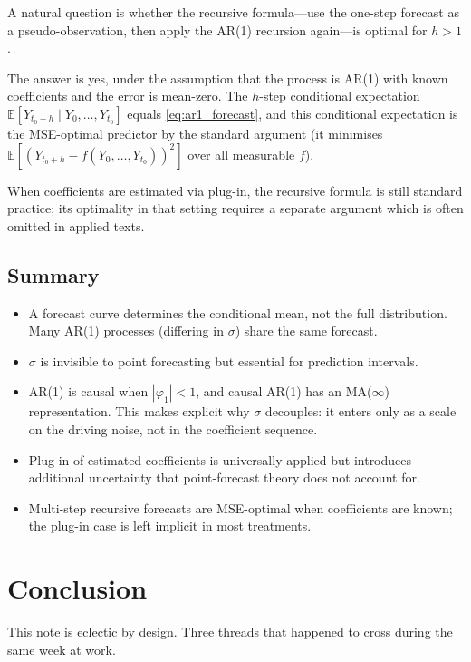 \documentclass[a4paper,oneside,12pt]{extarticle}
\theoremstyle{plain}
\theoremstyle{definition}
\theoremstyle{remark}
\newcommand*{\E}{\mathbb{E}}
\begin{document}
A natural question is whether the recursive formula---use the one-step
forecast as a pseudo-observation, then apply the AR(1) recursion again---is
optimal for $h > 1$.

The answer is yes, under the assumption that the process is AR(1) with
known coefficients and the error is mean-zero. The $h$-step conditional
expectation $\E[Y_{t_0+h} \mid Y_0, \ldots, Y_{t_0}]$ equals
\eqref{eq:ar1_forecast}, and this conditional expectation is the MSE-optimal
predictor by the standard argument (it minimises
$\E[(Y_{t_0+h} - f(Y_0,\ldots,Y_{t_0}))^2]$ over all measurable $f$).

When coefficients are estimated via plug-in, the recursive formula is still
standard practice; its optimality in that setting requires a separate
argument which is often omitted in applied texts.

\subsection{Summary}

\begin{itemize}
\item A forecast curve determines the conditional mean, not the full
  distribution. Many AR(1) processes (differing in $\sigma$) share the same
  forecast.
\item $\sigma$ is invisible to point forecasting but essential for
  prediction intervals.
\item AR(1) is causal when $|\varphi_1|<1$, and causal AR(1) has an
  MA($\infty$) representation. This makes explicit why $\sigma$ decouples:
  it enters only as a scale on the driving noise, not in the coefficient
  sequence.
\item Plug-in of estimated coefficients is universally applied but
  introduces additional uncertainty that point-forecast theory does not
  account for.
\item Multi-step recursive forecasts are MSE-optimal when coefficients are
  known; the plug-in case is left implicit in most treatments.
\end{itemize}

\section{Conclusion}

This note is eclectic by design. Three threads that happened to cross
during the same week at work.
\end{document}
